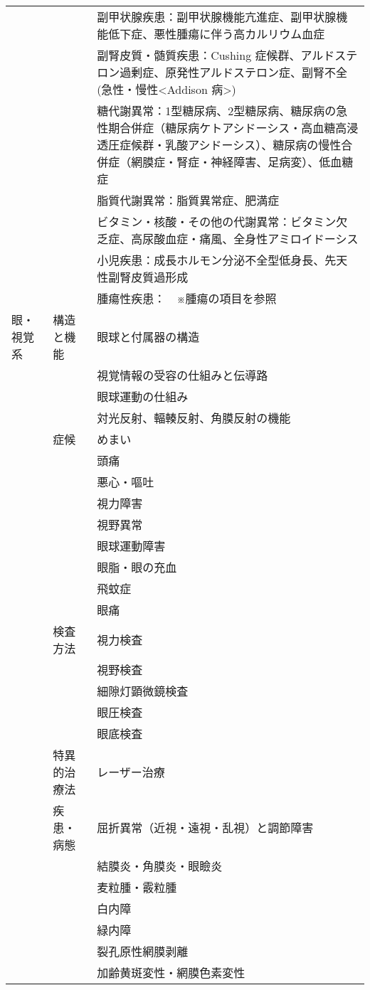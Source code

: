 \begin{xltabular}{\linewidth}{XXX}
 &  & 副甲状腺疾患：副甲状腺機能亢進症、副甲状腺機能低下症、悪性腫瘍に伴う高カルリウム血症 \\
 &  & 副腎皮質・髄質疾患：Cushing 症候群、アルドステロン過剰症、原発性アルドステロン症、副腎不全(急性・慢性<Addison 病>) \\
 &  & 糖代謝異常：1型糖尿病、2型糖尿病、糖尿病の急性期合併症（糖尿病ケトアシドーシス・高血糖高浸透圧症候群・乳酸アシドーシス）、糖尿病の慢性合併症（網膜症・腎症・神経障害、足病変）、低血糖症 \\
 &  & 脂質代謝異常：脂質異常症、肥満症 \\
 &  & ビタミン・核酸・その他の代謝異常：ビタミン欠乏症、高尿酸血症・痛風、全身性アミロイドーシス \\
 &  & 小児疾患：成長ホルモン分泌不全型低身長、先天性副腎皮質過形成 \\
 &  & 腫瘍性疾患：　※腫瘍の項目を参照 \\
眼・視覚系 & 構造と機能 & 眼球と付属器の構造 \\
 &  & 視覚情報の受容の仕組みと伝導路 \\
 &  & 眼球運動の仕組み \\
 &  & 対光反射、輻輳反射、角膜反射の機能 \\
 & 症候 & めまい \\
 &  & 頭痛 \\
 &  & 悪心・嘔吐 \\
 &  & 視力障害 \\
 &  & 視野異常 \\
 &  & 眼球運動障害 \\
 &  & 眼脂・眼の充血 \\
 &  & 飛蚊症 \\
 &  & 眼痛 \\
 & 検査方法 & 視力検査 \\
 &  & 視野検査 \\
 &  & 細隙灯顕微鏡検査 \\
 &  & 眼圧検査 \\
 &  & 眼底検査 \\
 & 特異的治療法 & レーザー治療 \\
 & 疾患・病態 & 屈折異常（近視・遠視・乱視）と調節障害 \\
 &  & 結膜炎・角膜炎・眼瞼炎 \\
 &  & 麦粒腫・霰粒腫 \\
 &  & 白内障 \\
 &  & 緑内障 \\
 &  & 裂孔原性網膜剥離 \\
 &  & 加齢黄斑変性・網膜色素変性 \\

\end{xltabular}
